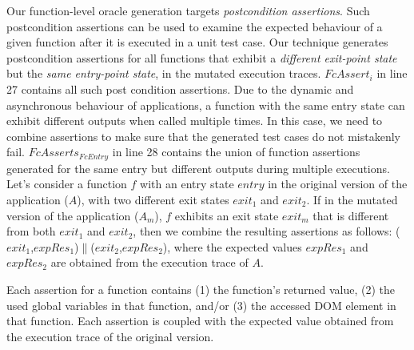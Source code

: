 Our function-level oracle generation targets \emph{postcondition assertions}.
Such postcondition assertions can be used to examine the expected behaviour of a given function after it is executed in a unit test case.
Our technique generates postcondition assertions for all functions that exhibit a \emph{different exit-point state} but the \emph{same entry-point state}, in the mutated execution traces. $FcAssert_i$ in line 27 contains all such post condition assertions. 
Due to the dynamic and asynchronous behaviour of \javascript applications, a function with the same entry state can exhibit different outputs when called multiple times. %
In this case, we need to combine assertions to make sure that the generated test cases do not mistakenly fail. $FcAsserts_{FcEntry}$ in line 28
contains the union of function assertions generated for the same entry but different outputs during multiple executions.  
Let's consider a function $f$ with an entry state $entry$ in the original version of the application ($A$), with two different exit states $exit_1$ and $exit_2$. If in the mutated version of the application ($A_m$),  $f$ exhibits an exit state $exit_m$ that is different from both $exit_1$ and $exit_2$, then we combine the resulting assertions as follows: 
%
($exit_1$,$expRes_1$)$\parallel$($exit_2$,$expRes_2$), where the expected values $expRes_1$ and $expRes_2$ are obtained from the execution trace of  $A$. 

Each assertion for a function contains (1) the function's returned value, (2) the used global variables in that function, and/or (3) the accessed DOM element in that function. Each assertion is coupled with the expected value obtained from the execution trace of the original version. 
%


